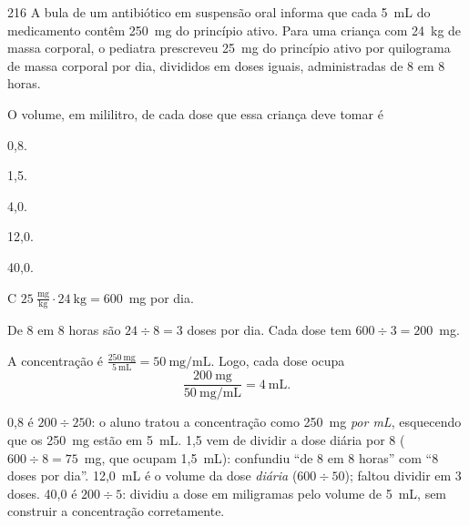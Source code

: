 \begin{questaoinedita}{2}{16}
A bula de um antibiótico em suspensão oral informa que cada 5~mL do medicamento
contêm 250~mg do princípio ativo. Para uma criança com 24~kg de massa corporal, o
pediatra prescreveu 25~mg do princípio ativo por quilograma de massa corporal por
dia, divididos em doses iguais, administradas de 8 em 8 horas.

O volume, em mililitro, de cada dose que essa criança deve tomar é
\begin{alternativas*}[5]
  \item 0,8.
  \item 1,5.
  \item 4,0.
  \item 12,0.
  \item 40,0.
\end{alternativas*}
\end{questaoinedita}
\begin{resolucao}{C}
 $25~\tfrac{\text{mg}}{\text{kg}} \cdot 24~\text{kg} = 600$~mg por dia.

 De 8 em 8 horas são $24 \div 8 = 3$ doses por dia. Cada
dose tem $600 \div 3 = 200$~mg.

 A concentração é
$\frac{250~\text{mg}}{5~\text{mL}} = 50~\text{mg/mL}$. Logo, cada dose ocupa
\[
\frac{200~\text{mg}}{50~\text{mg/mL}} = 4~\text{mL}.
\]
\begin{distratores}
 0,8 é $200 \div 250$: o aluno tratou a concentração como 250~mg \emph{por mL},
esquecendo que os 250~mg estão em 5~mL.
 1,5 vem de dividir a dose diária por 8 ($600 \div 8 = 75$~mg, que ocupam 1,5~mL):
confundiu ``de 8 em 8 horas'' com ``8 doses por dia''.
 12,0~mL é o volume da dose \emph{diária} ($600 \div 50$); faltou dividir em 3 doses.
 40,0 é $200 \div 5$: dividiu a dose em miligramas pelo volume de 5~mL, sem
construir a concentração corretamente.
\end{distratores}
\end{resolucao}

